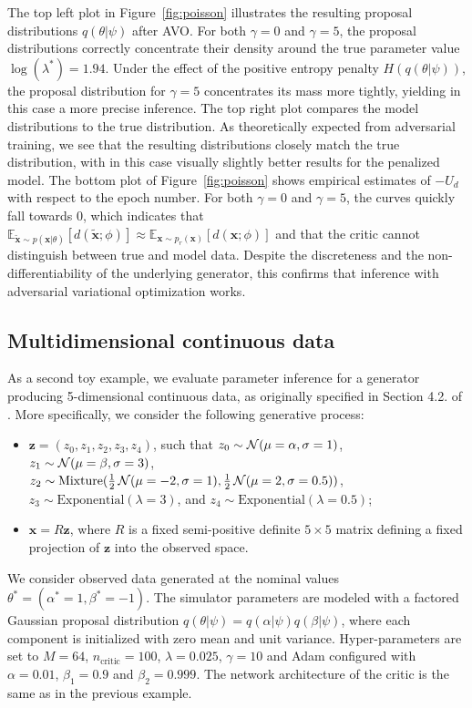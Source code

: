 \documentclass[twocolumn,superscriptaddress,aps]{revtex4-1}
\theoremstyle{plain}
\begin{document}
The top left plot in Figure~\ref{fig:poisson} illustrates the resulting proposal
distributions $q(\theta|\psi)$ after AVO.  For
both $\gamma=0$ and $\gamma=5$, the proposal distributions correctly concentrate
their density around the true parameter value $\log(\lambda^*) = 1.94$. Under
the effect of the positive entropy penalty $H(q(\theta|\psi))$,
the proposal distribution for $\gamma=5$ concentrates its mass more tightly,
yielding in this case a more precise inference.  The top right plot compares the
model distributions to the true distribution.  As theoretically expected from
adversarial training, we see that the resulting distributions closely match
the true distribution, with in this case visually slightly better results for the penalized
model.  The bottom plot of Figure~\ref{fig:poisson} shows empirical estimates
of $-U_d$ with respect to the epoch number. For both $\gamma=0$ and $\gamma=5$,
the curves quickly fall towards $0$, which indicates that
$\mathbb{E}_{\tilde{\mathbf{x}} \sim p(\mathbf{x}|\theta)}
[d(\tilde{\mathbf{x}};\phi)] \approx \mathbb{E}_{\mathbf{x} \sim
p_r(\mathbf{x})} [d(\mathbf{x};\phi)]$ and that the critic cannot distinguish
between true and model data. Despite the discreteness and the
non-differentiability of the underlying generator, this confirms that inference
with adversarial variational optimization works.


\subsection{Multidimensional continuous data}

As a second toy example, we evaluate parameter inference for a generator producing
5-dimensional continuous data, as originally specified in Section 4.2. of
\citep{cranmer2015approximating}. More specifically, we consider the following
generative process:
\begin{itemize}
    \item $\mathbf{z} = (z_0, z_1, z_2, z_3, z_4)$, such that
        $z_0 \sim {\cal N}(\mu=\alpha, \sigma=1)$,
        $z_1 \sim {\cal N}(\mu=\beta, \sigma=3)$,
        $z_2 \sim {\text{Mixture}}(\frac{1}{2}\,{\cal N}(\mu=-2, \sigma=1), \frac{1}{2}\,{\cal N}(\mu=2, \sigma=0.5))$,
        $z_3 \sim {\text{Exponential}(\lambda=3)}$, and
        $z_4 \sim {\text{Exponential}(\lambda=0.5)}$;
    \item $\mathbf{x} = R  \mathbf{z}$, where $R$ is a fixed
    semi-positive definite $5 \times 5$ matrix defining a fixed projection
    of $\mathbf{z}$ into the observed space.
\end{itemize}
We consider observed data generated at the nominal values $\theta^* = (\alpha^*=1,\beta^*=-1)$.
The simulator parameters are modeled with a factored Gaussian
proposal distribution $q(\theta|\psi) = q(\alpha|\psi) q(\beta|\psi)$, where each component is
initialized with zero mean and unit variance.
Hyper-parameters are set to $M=64$, $n_\text{critic}=100$, $\lambda=0.025$, $\gamma=10$ and
Adam configured with $\alpha=0.01$, $\beta_1=0.9$ and $\beta_2=0.999$.
The network architecture of the critic is the same as in the previous example.
\end{document}
